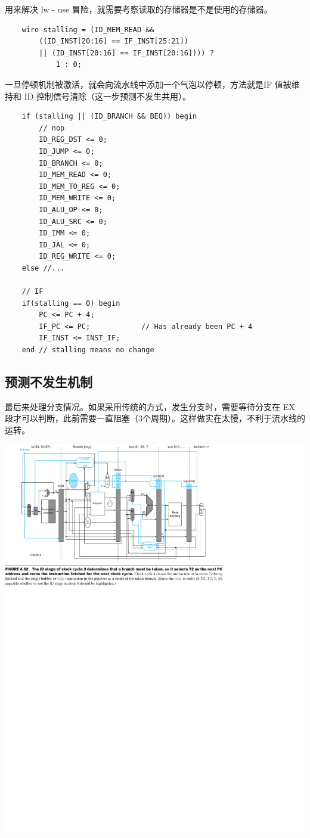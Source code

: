 \documentclass[a4paper,UTF8]{ctexart}
\begin{document}
用来解决 lw - use 冒险，就需要考察读取的存储器是不是使用的存储器。

\begin{verbatim}
    wire stalling = (ID_MEM_READ && 
        ((ID_INST[20:16] == IF_INST[25:21]) 
        || (ID_INST[20:16] == IF_INST[20:16]))) ? 
            1 : 0;
\end{verbatim}

一旦停顿机制被激活，就会向流水线中添加一个气泡以停顿，方法就是IF 值被维持和 ID 控制信号清除（这一步预测不发生共用）。

\begin{lstlisting}
    if (stalling || (ID_BRANCH && BEQ)) begin
        // nop
        ID_REG_DST <= 0;
        ID_JUMP <= 0;
        ID_BRANCH <= 0;
        ID_MEM_READ <= 0;
        ID_MEM_TO_REG <= 0;
        ID_MEM_WRITE <= 0;
        ID_ALU_OP <= 0;
        ID_ALU_SRC <= 0;
        ID_IMM <= 0;
        ID_JAL <= 0;
        ID_REG_WRITE <= 0;
    else //...

    // IF
    if(stalling == 0) begin
        PC <= PC + 4;
        IF_PC <= PC;            // Has already been PC + 4
        IF_INST <= INST_IF;
    end // stalling means no change
\end{lstlisting}

\subsection{预测不发生机制}\label{sec:pnt}

最后来处理分支情况。如果采用传统的方式，发生分支时，需要等待分支在 EX 段才可以判断，此前需要一直阻塞（3个周期）。这样做实在太慢，不利于流水线的运转。

\includegraphics[width=\textwidth]{predict-not-taken.pdf}
\end{document}
